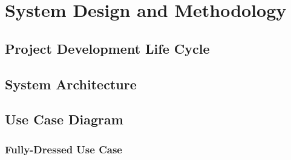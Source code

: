 \section{System Design and Methodology}

\subsection{Project Development Life Cycle}

\subsection{System Architecture}



\newpage

\subsection{Use Case Diagram}
\subsubsection{Fully-Dressed Use Case}

